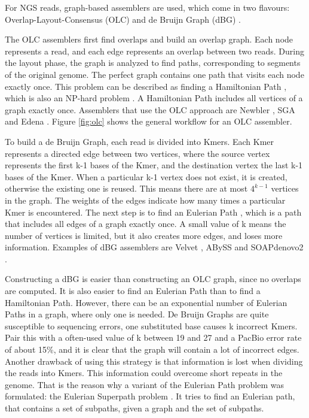 \documentclass[../main/thesis.tex]{subfiles}
\begin{document}
For NGS reads, graph-based assemblers are used, which come in two flavours: Overlap-Layout-Consensus (OLC) and de Bruijn Graph (dBG) \cite{OLC_DBG}.

The OLC assemblers first find overlaps and build an overlap graph.
Each node represents a read, and each edge represents an overlap between two reads.
During the layout phase, the graph is analyzed to find paths, corresponding to segments of the original genome.
The perfect graph contains one path that visits each node exactly once.
This problem can be described as finding a Hamiltonian Path \cite{Euler_Hamil_paths}, which is also an NP-hard problem \cite{ngs_difficulties}.
A Hamiltonian Path includes all vertices of a graph exactly once.
Assemblers that use the OLC approach are Newbler \cite{newbler}, SGA \cite{sga} and Edena \cite{edena}.
Figure \ref{fig:olc} shows the general workflow for an OLC assembler.


To build a de Bruijn Graph, each read is divided into Kmers.
Each Kmer represents a directed edge between two vertices, where the source vertex represents the first k-1 bases of the Kmer, and the destination vertex the last k-1 bases of the Kmer.
When a particular k-1 vertex does not exist, it is created, otherwise the existing one is reused.
This means there are at most $4^{k-1}$ vertices in the graph.
The weights of the edges indicate how many times a particular Kmer is encountered.
The next step is to find an Eulerian Path \cite{Euler_Hamil_paths}, which is a path that includes all edges of a graph exactly once.
A small value of k means the number of vertices is limited, but it also creates more edges, and loses more information.
Examples of dBG assemblers are Velvet \cite{velvet}, ABySS \cite{abyss} and SOAPdenovo2 \cite{soapdenovo2}.

Constructing a dBG is easier than constructing an OLC graph, since no overlaps are computed.
It is also easier to find an Eulerian Path than to find a Hamiltonian Path.
However, there can be an exponential number of Eulerian Paths in a graph, where only one is needed.
De Bruijn Graphs are quite susceptible to sequencing errors, one substituted base causes k incorrect Kmers.
Pair this with a often-used value of k between 19 and 27 and a PacBio error rate of about 15\%, and it is clear that the graph will contain a lot of incorrect edges.
Another drawback of using this strategy is that information is lost when dividing the reads into Kmers.
This information could overcome short repeats in the genome.
That is the reason why a variant of the Eulerian Path problem was formulated: the Eulerian Superpath problem \cite{Eulerian_Superpath}.
It tries to find an Eulerian path, that contains a set of subpaths, given a graph and the set of subpaths.
\end{document}
